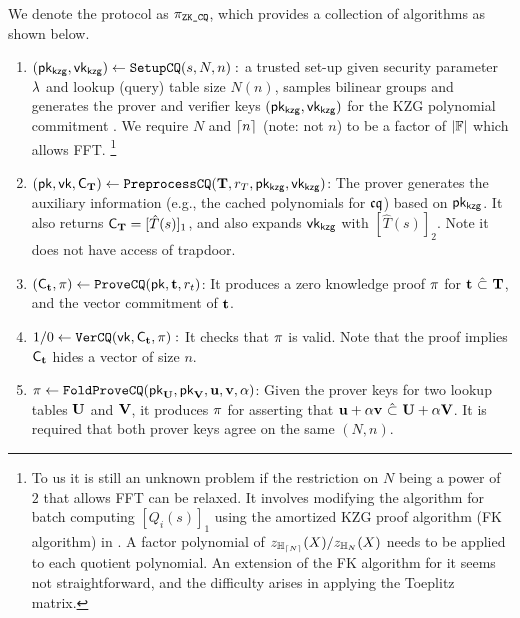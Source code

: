 We denote the protocol as $\pi_\texttt{ZK\_CQ}$, which provides
a collection of algorithms as shown below. 

\begin{enumerate}
	\item $(\mathsf{pk_{kzg}},\mathsf{vk_{kzg}}) \leftarrow {\texttt{SetupCQ}}(s, N, n): $ a trusted set-up
	given security parameter $\lambda$ and lookup (query) table size
	$N (n)$, samples bilinear groups and generates the
	prover and verifier keys $(\mathsf{pk_{kzg}}, \mathsf{vk_{kzg}})$ for the KZG 
	polynomial commitment \cite{Kate10}. We require $N$ and
	${\lceil{n}\rceil}$ (note: not $n$) to be a factor
	of $|\mathbb{F}|$ which allows FFT. 
	\footnote{To us it is still an unknown problem if the restriction on
	$N$ being a power of $2$ that allows FFT can be relaxed.
	It involves modifying the algorithm for batch computing
	$[Q_i(s)]_1$ using the amortized KZG proof algorithm (FK algorithm) 
	in \cite{FK23}.
	A factor polynomial of $z_{{\mathbb{H}_{{\lceil{N}\rceil}}}}(X)/z_{\mathbb{H}_{N}}(X)$ needs to be applied
	to each quotient polynomial. An extension of the
	FK algorithm for it seems not straightforward, and the difficulty
	arises in applying the Toeplitz matrix.}

	\item $(\mathsf{pk},\mathsf{vk},{\mathsf{C}}_{{{\mathbf {T}}}}) 
		\leftarrow {\texttt{PreprocessCQ}}({{\mathbf {T}}}, r_T, \mathsf{pk_{kzg}},\mathsf{vk_{kzg}})$: The prover
	generates the auxiliary information 
	(e.g., the cached polynomials for ${\mathfrak{cq}}$) 
	based on $\mathsf{pk_{kzg}}$.
	It also returns 
	${{\mathsf{C}}_{{{\mathbf {T}}}}} = [\hat{T}(s)]_1$, and also expands $\mathsf{vk_{kzg}}$ with
	$[\hat{T}(s)]_2$. Note it
	does not have access of trapdoor.

	\item $({{\mathsf{C}}_{{{\mathbf {t}}}}}, \pi)
	\leftarrow {\texttt{ProveCQ}}(\mathsf{pk}, {{\mathbf {t}}}, r_t)$: It produces
	a zero knowledge proof $\pi$ for
	${{\mathbf {t}}} ~\hat{\subset}~ {{\mathbf {T}}}$, and 
	the vector commitment of ${{\mathbf {t}}}$.

	\item $1/0 \leftarrow {\texttt{VerCQ}}(\mathsf{vk}, 
	{\mathsf{C}}_{{{\mathbf {t}}}}, \pi):$ It checks that $\pi$ is valid.
	Note that the proof implies ${{\mathsf{C}}_{{{\mathbf {t}}}}}$ hides a vector of size $n$.

	\item $\pi 
	\leftarrow {\texttt{FoldProveCQ}}(\mathsf{pk}_{{{\mathbf {U}}}}, 
		\mathsf{pk}_{{{\mathbf {V}}}}, 
		{{\mathbf {u}}}, {{\mathbf {v}}}, \alpha)$: Given the 
		prover keys for two lookup tables ${{\mathbf {U}}}$ and ${{\mathbf {V}}}$,
		it produces $\pi$ for asserting that
		${{\mathbf {u}}} + \alpha {{\mathbf {v}}} ~\hat{\subset}~ {{\mathbf {U}}} + \alpha {{\mathbf {V}}}$.
		It is required that both prover keys agree on the same
		$(N,n)$.
\end{enumerate}


